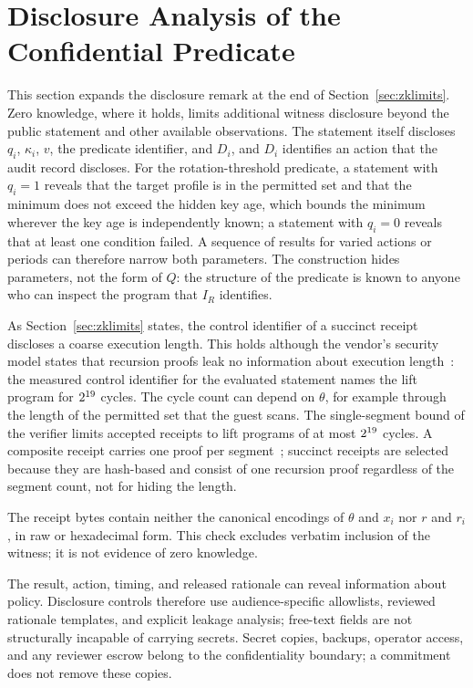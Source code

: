 \documentclass[journal]{IEEEtran}
\begin{document}
\section{Disclosure Analysis of the Confidential Predicate}
\label{s:zkprivacy}
This section expands the disclosure remark at the end of Section~\ref{sec:zklimits}. Zero knowledge, where it holds, limits additional witness disclosure beyond the public statement and other available observations. The statement itself discloses $q_i$, $\kappa_i$, $v$, the predicate identifier, and $D_i$, and $D_i$ identifies an action that the audit record discloses. For the rotation-threshold predicate, a statement with $q_i=1$ reveals that the target profile is in the permitted set and that the minimum does not exceed the hidden key age, which bounds the minimum wherever the key age is independently known; a statement with $q_i=0$ reveals that at least one condition failed. A sequence of results for varied actions or periods can therefore narrow both parameters. The construction hides parameters, not the form of $Q$: the structure of the predicate is known to anyone who can inspect the program that $I_R$ identifies.

As Section~\ref{sec:zklimits} states, the control identifier of a succinct receipt discloses a coarse execution length. This holds although the vendor's security model states that recursion proofs leak no information about execution length~\cite{risc0sec}: the measured control identifier for the evaluated statement names the lift program for $2^{19}$ cycles. The cycle count can depend on $\theta$, for example through the length of the permitted set that the guest scans. The single-segment bound of the verifier limits accepted receipts to lift programs of at most $2^{19}$ cycles. A composite receipt carries one proof per segment~\cite{risc0}; succinct receipts are selected because they are hash-based and consist of one recursion proof regardless of the segment count, not for hiding the length.

The receipt bytes contain neither the canonical encodings of $\theta$ and $x_i$ nor $r$ and $r_i$, in raw or hexadecimal form. This check excludes verbatim inclusion of the witness; it is not evidence of zero knowledge.

The result, action, timing, and released rationale can reveal information about policy. Disclosure controls therefore use audience-specific allowlists, reviewed rationale templates, and explicit leakage analysis; free-text fields are not structurally incapable of carrying secrets. Secret copies, backups, operator access, and any reviewer escrow belong to the confidentiality boundary; a commitment does not remove these copies.
\end{document}

